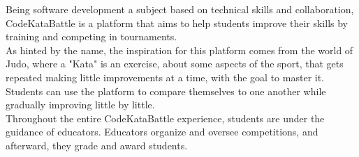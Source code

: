 



%


\setlength{\leftmargini}{5em} %
Being software development a subject based on technical skills and collaboration, CodeKataBattle is a platform that aims to help students improve their skills by training and competing in tournaments.\\
As hinted by the name, the inspiration for this platform comes from the world of Judo, where a "Kata" is an exercise, about some aspects of the sport, that gets repeated making little improvements at a time, with the goal to master it.\\ 
Students can use the platform to compare themselves to one another while gradually improving little by little.\\ 
Throughout the entire CodeKataBattle experience, students are under the guidance of educators. 
Educators organize and oversee competitions, and afterward, they grade and award students.
